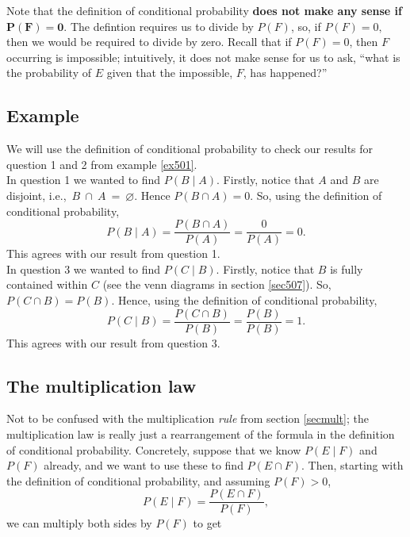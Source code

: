 \noindent Note that the definition of conditional probability \textbf{does not make any sense if} $\boldsymbol{P(F) = 0}.$ The defintion requires us to divide by $P(F)$, so, if $P(F) = 0,$ then we would be required to divide by zero. Recall that if $P(F) = 0$, then $F$ occurring is impossible; intuitively, it does not make sense for us to ask, ``what is the probability of $E$ given that the impossible, $F$, has happened?''

\subsection{Example}
We will use the definition of conditional probability to check our results for question 1 and 2 from example \ref{ex501}. \\

\noindent In question 1 we wanted to find $P(B\! \mid \! A)$. Firstly, notice that $A$ and $B$ are disjoint, i.e.,~$B~\cap~A~=~\varnothing$. Hence $P(B \cap A) = 0$. So, using the definition of conditional probability,
\[
P(B \! \mid \! A) = \frac{P(B \cap A)}{P(A)} = \frac{0}{P(A)} = 0.
\]
This agrees with our result from question 1. \\

\noindent In question 3 we wanted to find $P(C \! \mid \! B)$. Firstly, notice that $B$ is fully contained within $C$ (see the venn diagrams in section \ref{sec507}). So, $P(C \cap B) = P(B)$. Hence, using the definition of conditional probability,
\[
P(C \! \mid \! B) = \frac{P(C \cap B)}{P(B)} = \frac{P(B)}{P(B)} = 1.
\]
This agrees with our result from question 3.

\subsection{The multiplication law} \label{multiplication law}
Not to be confused with the multiplication \textit{rule} from section \ref{secmult}; the multiplication law is really just a rearrangement of the formula in the definition of conditional probability. Concretely, suppose that we know $P(E \!\mid \! F)$ and $P(F)$ already, and we want to use these to find $P(E \cap F)$. Then, starting with the definition of conditional probability, and assuming $P(F) > 0$,
\[
P(E \! \mid \! F) = \frac{P(E \cap F)}{P(F)},
\]
we can multiply both sides by $P(F)$ to get \label{the multiplication law}
\bigskip

\hfil{}
\bigskip


